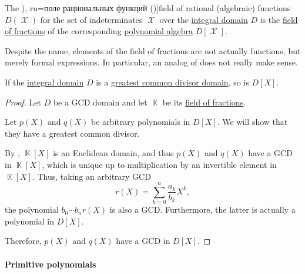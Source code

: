 \begin{definition}\label{def:rational_function_field}
  The \term[bg=поле на рационалните функции (\cite[360]{ГеновМиховскиМоллов1991Алгебра}), ru=поле рациональных функций (\cite[18]{Шафаревич1999Алгебра})]{field of rational (algebraic) functions} \( D(\mscrX) \) for the set of indeterminates \( \mscrX \) over the \hyperref[def:integral_domain]{integral domain} \( D \) is the \hyperref[def:field_of_fractions]{field of fractions} of the corresponding \hyperref[def:polynomial_algebra]{polynomial algebra} \( D[\mscrX] \).
\end{definition}
\begin{comments}
  \item Despite the name, elements of the field of fractions are not actually functions, but merely formal expressions. In particular, an analog of  does not really make sense.
\end{comments}

\begin{proposition}\label{thm:polynomial_ring_over_gcd_domain}
  If the \hyperref[def:integral_domain]{integral domain} \( D \) is a \hyperref[def:gcd_domain]{greatest common divisor domain}, so is \( D[X] \).
\end{proposition}
\begin{proof}
  Let \( D \) be a GCD domain and let \( \BbbK \) be its \hyperref[def:field_of_fractions]{field of fractions}.

  Let \( p(X) \) and \( q(X) \) be arbitrary polynomials in \( D[X] \). We will show that they have a greatest common divisor.

  By , \( \BbbK[X] \) is an Euclidean domain, and thus \( p(X) \) and \( q(X) \) have a GCD in \( \BbbK[X] \), which is unique up to multiplication by an invertible element in \( \BbbK[X] \). Thus, taking an arbitrary GCD
  \begin{equation*}
    r(X) = \sum_{k=0}^n \frac {a_k} {b_k} X^k,
  \end{equation*}
  the polynomial \( b_0 \cdots b_n r(X) \) is also a GCD. Furthermore, the latter is actually a polynomial in \( D[X] \).

  Therefore, \( p(X) \) and \( q(X) \) have a GCD in \( D[X] \).
\end{proof}

\paragraph{Primitive polynomials}

